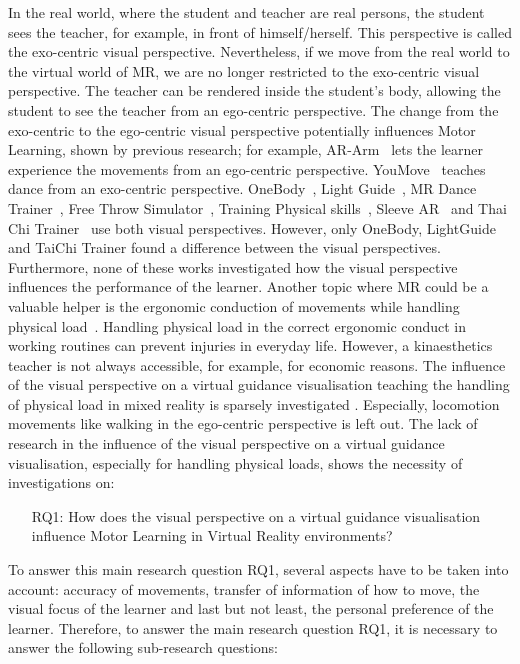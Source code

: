In the real world, where the student and teacher are real persons, the student sees the teacher, for example, in front of himself/herself. This perspective is called the exo-centric visual perspective. Nevertheless, if we move from the real world to the virtual world of MR, we are no longer restricted to the exo-centric visual perspective. The teacher can be rendered inside the student's body, allowing the student to see the teacher from an ego-centric perspective. The change from the exo-centric to the ego-centric visual perspective potentially influences Motor Learning, shown by previous research; for example, AR-Arm~\cite{ararm} lets the learner experience the movements from an ego-centric perspective. YouMove~\cite{YouMove} teaches dance from an exo-centric perspective. OneBody~\cite{onebody}, Light Guide~\cite{lightguide}, MR Dance Trainer~\cite{mrdancetrainer}, Free Throw Simulator~\cite{freethrowsimulator}, Training Physical skills~\cite{trainingphysicalskills}, Sleeve AR~\cite{sleevear} and Thai Chi Trainer~\cite{thaichichua} use both visual perspectives. However, only OneBody, LightGuide and TaiChi Trainer found a difference between the visual perspectives. Furthermore, none of these works investigated how the visual perspective influences the performance of the learner. Another topic where MR could be a valuable helper is the ergonomic conduction of movements while handling physical load~\cite{nursecare,kitt}. Handling physical load in the correct ergonomic conduct in working routines can prevent injuries in everyday life. However, a kinaesthetics teacher is not always accessible, for example, for economic reasons. The influence of the visual perspective on a virtual guidance visualisation teaching the handling of physical load in mixed reality is sparsely investigated  . Especially, locomotion movements like walking in the ego-centric perspective is left out. The lack of research in the influence of the visual perspective on a virtual guidance visualisation, especially for handling physical loads, shows the necessity of investigations on:
\begin{itemize}
	\item[RQ1:] How does the visual perspective on a virtual guidance visualisation influence Motor Learning in Virtual Reality environments?
\end{itemize}
To answer this main research question RQ1, several aspects have to be taken into account: accuracy of movements, transfer of information of how to move, the visual focus of the learner and last but not least, the personal preference of the learner. Therefore, to answer the main research question RQ1, it is necessary to answer the following sub-research questions:
